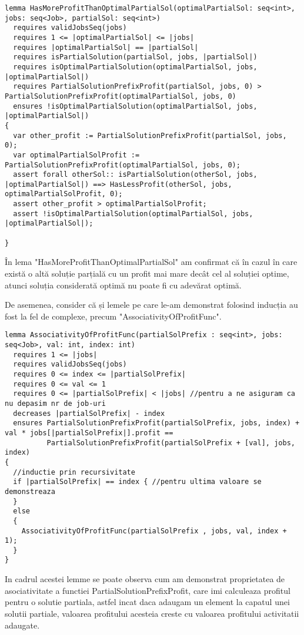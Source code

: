 \begin{lstlisting}
lemma HasMoreProfitThanOptimalPartialSol(optimalPartialSol: seq<int>, jobs: seq<Job>, partialSol: seq<int>)
  requires validJobsSeq(jobs)
  requires 1 <= |optimalPartialSol| <= |jobs|
  requires |optimalPartialSol| == |partialSol|
  requires isPartialSolution(partialSol, jobs, |partialSol|)
  requires isOptimalPartialSolution(optimalPartialSol, jobs, |optimalPartialSol|)
  requires PartialSolutionPrefixProfit(partialSol, jobs, 0) > PartialSolutionPrefixProfit(optimalPartialSol, jobs, 0)
  ensures !isOptimalPartialSolution(optimalPartialSol, jobs, |optimalPartialSol|)
{
  var other_profit := PartialSolutionPrefixProfit(partialSol, jobs, 0);
  var optimalPartialSolProfit := PartialSolutionPrefixProfit(optimalPartialSol, jobs, 0);
  assert forall otherSol:: isPartialSolution(otherSol, jobs, |optimalPartialSol|) ==> HasLessProfit(otherSol, jobs, optimalPartialSolProfit, 0);
  assert other_profit > optimalPartialSolProfit;
  assert !isOptimalPartialSolution(optimalPartialSol, jobs, |optimalPartialSol|);

}
\end{lstlisting}
În lema "HasMoreProfitThanOptimalPartialSol" am confirmat că în cazul în care există o altă soluție parțială cu un profit mai mare decât cel al soluției optime, atunci soluția considerată optimă nu poate fi cu adevărat optimă.

De asemenea, consider că și lemele pe care le-am demonstrat folosind inducția au fost la fel de complexe, precum "AssociativityOfProfitFunc".

\begin{lstlisting}
lemma AssociativityOfProfitFunc(partialSolPrefix : seq<int>, jobs: seq<Job>, val: int, index: int)
  requires 1 <= |jobs|
  requires validJobsSeq(jobs)
  requires 0 <= index <= |partialSolPrefix|
  requires 0 <= val <= 1
  requires 0 <= |partialSolPrefix| < |jobs| //pentru a ne asiguram ca nu depasim nr de job-uri
  decreases |partialSolPrefix| - index
  ensures PartialSolutionPrefixProfit(partialSolPrefix, jobs, index) + val * jobs[|partialSolPrefix|].profit ==
          PartialSolutionPrefixProfit(partialSolPrefix + [val], jobs, index)
{
  //inductie prin recursivitate
  if |partialSolPrefix| == index { //pentru ultima valoare se demonstreaza
  }
  else
  {
    AssociativityOfProfitFunc(partialSolPrefix , jobs, val, index + 1);
  }
}

\end{lstlisting}
In cadrul acestei lemme se poate observa cum am demonstrat proprietatea de asociativitate a functiei  PartialSolutionPrefixProfit, care imi calculeaza profitul pentru o solutie partiala, astfel incat daca adaugam un element la capatul unei solutii partiale, valoarea profitului acesteia creste cu valoarea profitului activitatii adaugate. 

